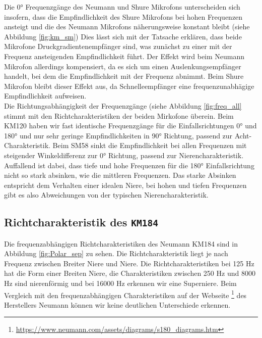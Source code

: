 Die 0° Frequenzgänge des Neumann und Shure Mikrofons unterscheiden sich insofern, dass die Empfindlichkeit des Shure Mikrofons bei hohen Frequenzen ansteigt und die des Neumann Mikrofons näherungsweise konstant bleibt (siehe Abbildung \ref{fig:km_sm})
Dies lässt sich mit der Tatsache erklären, dass beide Mikrofone Druckgradientenempfänger sind, was zunächst zu einer mit der Frequenz ansteigenden Empfindlichkeit führt.
Der Effekt wird beim Neumann Mikrofon allerdings kompensiert, da es sich um einen Auslenkungsempfänger handelt, bei dem die Empfindlichkeit mit der Frequenz abnimmt.
Beim Shure Mikrofon bleibt dieser Effekt aus, da Schnelleempfänger eine frequenzunabhägige Empfindlichkeit aufweisen.\\
Die Richtungsabhängigkeit der Frequenzgänge (siehe Abbildung \ref{fig:freq_all} stimmt mit den Richtcharakteristiken der beiden Mirkofone überein. 
Beim KM120 haben wir fast identische Frequenzgänge für die Einfallsrichtungen 0° und 180° und nur sehr geringe Empfindlichkeiten in 90° Richtung, passend zur Acht-Charakteristik.
Beim SM58 sinkt die Empfindlichkeit bei allen Frequenzen mit steigender Winkeldifferenz zur 0° Richtung, passend zur Nierencharakteristik.
Auffallend ist dabei, dass tiefe und hohe Frequenzen für die 180° Einfallsrichtung nicht so stark absinken, wie die mittleren Frequenzen.
Das starke Absinken entspricht dem Verhalten einer idealen Niere, bei hohen und tiefen Frequenzen gibt es also Abweichungen von der typischen Nierencharakteristik.  


\subsection{Richtcharakteristik des \texttt{KM184}}
\label{subsec:d}
Die frequenzabhängigen Richtcharakteristiken des Neumann KM184 sind in Abbildung \ref{fig:Polar_sep} zu sehen.
Die Richtcharakteristik liegt je nach Frequenz zwischen Breiter Niere und Niere. 
Die Richtcharakteristiken bei 125 Hz hat die Form einer Breiten Niere, die Charakteristiken zwischen 250 Hz und 8000 Hz sind nierenförmig und bei 16000 Hz erkennen wir eine Superniere.
Beim Vergleich mit den frequenzabhängigen Charakteristiken auf der Webseite \footnote{\url{https://www.neumann.com/assets/diagrams/s180_diagrams.htm}} des Herstellers Neumann können wir keine deutlichen Unterschiede erkennen.

